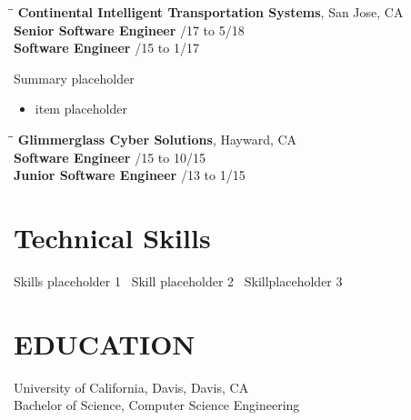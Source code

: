 \documentclass{res}
\begin{document}
\begin{resume}
   \vspace{-10pt}
   \begin{tabbing}
   	\hspace{2.3in}\= \hspace{2.6in}\= \kill %
   	{\bf Continental Intelligent Transportation Systems}, San Jose, CA \\
	{\bf Senior Software Engineer} \> /17 to 5/18 \\
   	{\bf Software Engineer} \> /15 to 1/17 \\
   \end{tabbing}\vspace{-32pt}      %
   Summary placeholder %
   \vspace{2pt}
   \begin{itemize}\addtolength{\itemsep}{-0.5\baselineskip}
	\item item placeholder %
   \end{itemize}
   
   \vspace{-10pt}
   \begin{tabbing}
   \hspace{2.3in}\= \hspace{2.6in}\= \kill %
    {\bf Glimmerglass Cyber Solutions}, Hayward, CA \\
	    {\bf Software Engineer} \> /15 to 10/15 \\
	    {\bf Junior Software Engineer} \> /13 to 1/15 \\
   \end{tabbing}\vspace{-32pt}      %

\vspace{10pt}
\begin{minipage}{\linewidth}
\section{Technical Skills}
\vspace{-1pt}
\setlength{\columnsep}{1em}
	Skills placeholder 1
	\textbullet\
	Skill placeholder 2
	\textbullet\
	Skillplaceholder 3
\end{minipage}

\vspace{-10pt}
\section{EDUCATION}
    University of California, Davis, Davis, CA  \\
    Bachelor of Science, Computer Science Engineering
\end{resume}
\end{document}
